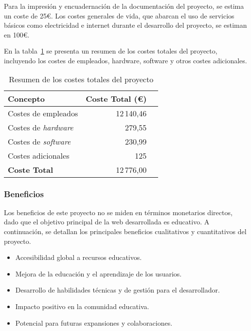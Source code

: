 Para la impresión y encuadernación de la documentación del proyecto, se estima un coste de 25€. Los costes generales de vida, que abarcan el uso de servicios básicos como electricidad e internet durante el desarrollo del proyecto, se estiman en 100€.

En la tabla~\ref{tabla:costes_totales} se presenta un resumen de los costes totales del proyecto, incluyendo los costes de empleados, hardware, software y otros costes adicionales.

\begin{table}[H]
    \centering
    \begin{tabular}{lrr}
        \toprule
        \textbf{Concepto}      & \textbf{Coste Total (€)} \\ \midrule
        Costes de empleados     & 12\,140,46                      \\
        Costes de \textit{hardware} & 279,55                       \\
        Costes de \textit{software} & 230,99                       \\
        Costes adicionales      & 125                         \\ \midrule
        \textbf{Coste Total}    & 12\,776,00                      \\ \bottomrule
    \end{tabular}
    \caption{Resumen de los costes totales del proyecto}
    \label{tabla:costes_totales}
\end{table}

\subsubsection{Beneficios}
Los beneficios de este proyecto no se miden en términos monetarios directos, dado que el objetivo principal de la web desarrollada es educativo. A continuación, se detallan los principales beneficios cualitativos y cuantitativos del proyecto.

\begin{itemize}
    \item Accesibilidad global a recursos educativos.
    \item Mejora de la educación y el aprendizaje de los usuarios.
    \item Desarrollo de habilidades técnicas y de gestión para el desarrollador.
    \item Impacto positivo en la comunidad educativa.
    \item Potencial para futuras expansiones y colaboraciones.
\end{itemize}

